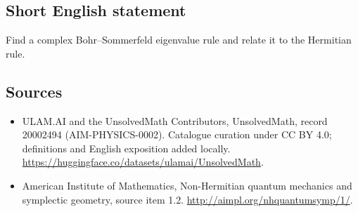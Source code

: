 \documentclass[11pt]{article}
\begin{document}
\subsection{Short English statement}
Find a complex Bohr--Sommerfeld eigenvalue rule and relate it to the Hermitian rule.
\subsection{Sources}
\begin{itemize}
\item[\hypertarget{source:20002494:1}{S1}] ULAM.AI and the UnsolvedMath Contributors, UnsolvedMath, record 20002494 (AIM-PHYSICS-0002). Catalogue curation under CC BY 4.0; definitions and English exposition added locally.
\url{https://huggingface.co/datasets/ulamai/UnsolvedMath}.
\item[\hypertarget{source:20002494:2}{S2}] American Institute of Mathematics, Non-Hermitian quantum mechanics and symplectic geometry, source item 1.2.
\url{http://aimpl.org/nhquantumsymp/1/}.
\end{itemize}
\label{end:20002494}
\end{document}
